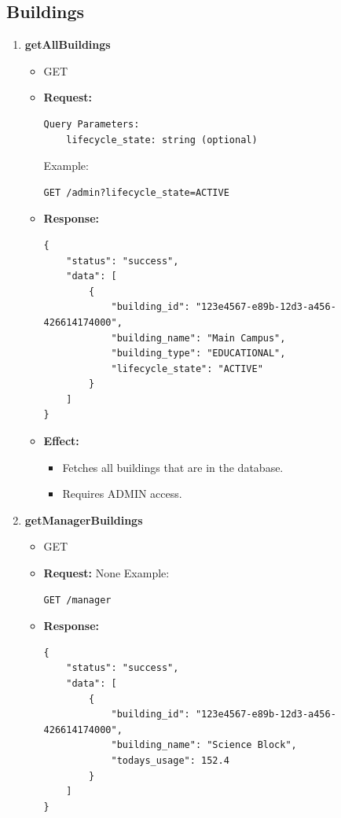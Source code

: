 \documentclass[12pt, a4paper]{article}
\begin{document}
\subsection{Buildings}
\begin{enumerate}
    \item \textbf{getAllBuildings}
    \begin{itemize}
        \item GET
        \item \textbf{Request:}
        \begin{verbatim}
Query Parameters:
    lifecycle_state: string (optional)
        \end{verbatim}
        Example:
        \begin{verbatim}
GET /admin?lifecycle_state=ACTIVE
        \end{verbatim}
        \item \textbf{Response:}
        \begin{verbatim}
{
    "status": "success",
    "data": [
        {
            "building_id": "123e4567-e89b-12d3-a456-426614174000",
            "building_name": "Main Campus",
            "building_type": "EDUCATIONAL",
            "lifecycle_state": "ACTIVE"
        }
    ]
}
        \end{verbatim}
        \item \textbf{Effect:}
        \begin{itemize}
            \item Fetches all buildings that are in the database.
            \item Requires ADMIN access.
        \end{itemize}
    \end{itemize}
    \item \textbf{getManagerBuildings}
    \begin{itemize}
        \item GET 
        \item \textbf{Request:} None
        Example:
        \begin{verbatim}
GET /manager
        \end{verbatim}
        \item \textbf{Response:}
        \begin{verbatim}
{
    "status": "success",
    "data": [
        {
            "building_id": "123e4567-e89b-12d3-a456-426614174000",
            "building_name": "Science Block",
            "todays_usage": 152.4
        }
    ]
}
        \end{verbatim}

\end{itemize}
\end{enumerate}
\end{document}
